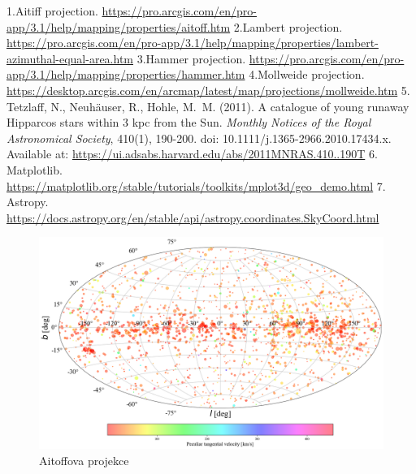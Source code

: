 \documentclass[a4paper,11pt]{article}
\begin{document}
    \begin{thebibliography}{9}
            1.Aitiff projection. \url{https://pro.arcgis.com/en/pro-app/3.1/help/mapping/properties/aitoff.htm}
            2.Lambert projection. \url{https://pro.arcgis.com/en/pro-app/3.1/help/mapping/properties/lambert-azimuthal-equal-area.htm}
            3.Hammer projection. \url{https://pro.arcgis.com/en/pro-app/3.1/help/mapping/properties/hammer.htm}
            4.Mollweide projection. \url{https://desktop.arcgis.com/en/arcmap/latest/map/projections/mollweide.htm}
            5. Tetzlaff, N., Neuh{\"a}user, R., Hohle, M.~M. (2011). A catalogue of young runaway Hipparcos stars within 3 kpc from the Sun. \textit{Monthly Notices of the Royal Astronomical Society}, 410(1), 190-200. doi: 10.1111/j.1365-2966.2010.17434.x. Available at: \url{https://ui.adsabs.harvard.edu/abs/2011MNRAS.410..190T}
            6. Matplotlib. \url{https://matplotlib.org/stable/tutorials/toolkits/mplot3d/geo_demo.html}
            7. Astropy. \url{https://docs.astropy.org/en/stable/api/astropy.coordinates.SkyCoord.html}
    \end{thebibliography}
                \begin{figure}
                    \centering
                    \includegraphics[width=1\textwidth]{aitoff}
                    \caption{Aitoffova projekce}
                    \label{fig:aitoff}
                \end{figure}
\end{document}
